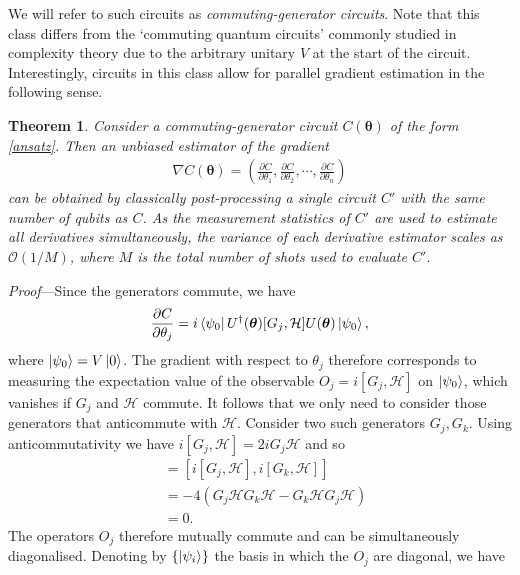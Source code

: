 \documentclass[a4paper,twocolumn,11pt,accepted=2025-09-06]{quantumarticle}
\newtheorem{theorem}{Theorem}
\renewcommand{\vec}{\boldsymbol}
\begin{document}
We will refer to such circuits as \emph{commuting-generator circuits}. Note that this class differs from the `commuting quantum circuits' \cite{bremner2016average,ni2012commuting} commonly studied in complexity theory due to the arbitrary unitary $V$ at the start of the circuit. Interestingly, circuits in this class allow for parallel gradient estimation in the following sense. 
%
\begin{theorem}\label{thm:grad}
Consider a commuting-generator circuit $C(\vec{\theta})$ of the form \eqref{ansatz}. %
Then an unbiased estimator of the gradient
\begin{align}
    \nabla C(\vec{\theta})=\left(\frac{\partial C}{\partial \theta_1},\frac{\partial C}{\partial \theta_2},\cdots,\frac{\partial C}{\partial \theta_n}\right)
\end{align}
can be obtained by classically post-processing a single circuit $C'$ with the same number of qubits as $C$.
As the measurement statistics of $C'$ are used to estimate all derivatives simultaneously, the variance of each derivative estimator scales as $\mathcal{O}(1/M)$, where $M$ is the total number of shots used to evaluate $C'$.
\end{theorem}
%
\emph{Proof}---Since the generators commute, we have 
%
\begin{align}\label{thegrad}
    \frac{\partial C}{\partial \theta_j}= i \bra{\psi_0} U^{\dagger}(\vec{\theta})[G_j,\mathcal{H}]U(\vec{\theta})\ket{\psi_0},
\end{align}
%
where $\ket{\psi_0}=V\ket{0}$. The gradient with respect to $\theta_j$ therefore corresponds to measuring the expectation value of the observable $O_j=i[G_j,\mathcal{H}]$ on $\ket{\psi_0}$, which vanishes if $G_j$ and $\mathcal{H}$ commute. It follows that we only need to consider those generators that anticommute with $\mathcal{H}$. Consider two such generators $G_j, G_k$. Using anticommutativity we have $i[G_j,\mathcal{H}] = 2iG_j\mathcal{H}$ and so
%
\begin{align}
    [O_j,O_k] &= [i[G_j,\mathcal{H}],i[G_k,\mathcal{H}]] \nonumber\\
    &=-4(G_j\mathcal{H}G_k\mathcal{H}-G_k\mathcal{H}G_j\mathcal{H}) \nonumber \\
    &=0.
\end{align}
%
The operators $O_j$ therefore mutually commute and can be simultaneously diagonalised. Denoting by $\{\ket{\psi_i}\}$ the basis in which the $O_j$ are diagonal, we have
\end{document}
